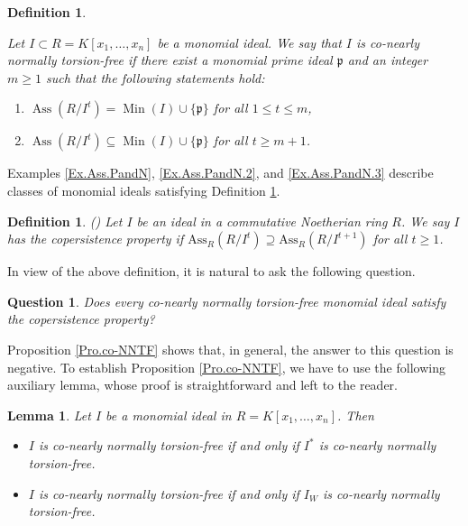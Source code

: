 \documentclass[11pt]{amsart}
\newtheorem{question}[theorem]{Question}
\newtheorem{lemma}[theorem]{Lemma}
\newtheorem{definition}[theorem]{Definition}
\begin{document}
   \begin{definition}\label{Def.co-NNTF}
\em{
Let $I \subset R = K[x_1,\dots,x_n]$ be a  monomial ideal. We say that  $I$ is \textit{co-nearly normally torsion-free}
 if there exist  a monomial prime ideal $\mathfrak{p}$ 
and an integer $m \geq 1$ such that  the following statements hold:
\begin{enumerate}
\item[(i)]  $\operatorname{Ass}(R/I^t) = \operatorname{Min}(I) \cup \{\mathfrak{p}\}$ for all $1 \leq t \leq m$,
\item[(ii)]   $\operatorname{Ass}(R/I^t) \subseteq \operatorname{Min}(I) \cup \{\mathfrak{p}\}$ for all $t \geq m+1$.
\end{enumerate}
}
\end{definition}

Examples  \ref{Ex.Ass.PandN},  \ref{Ex.Ass.PandN.2}, and \ref{Ex.Ass.PandN.3} describe classes of monomial ideals satisfying 
Definition \ref{Def.co-NNTF}.


 \begin{definition} (\cite{NT.3})
    \em{Let $I$ be an ideal in  a commutative Noetherian ring  $R$.
      We say   $I$  has the \textit{copersistence property} if 
$\mathrm{Ass}_R(R/I^t) \supseteq  \mathrm{Ass}_R(R/I^{t+1})$ for all $t\geq 1$.   
   }
  \end{definition}
  
  In view of the above definition, it is natural to ask the following question.
  
  \begin{question}
  Does every co-nearly normally torsion-free monomial ideal satisfy the copersistence property?
    \end{question}
  
  
  Proposition \ref{Pro.co-NNTF} shows that, in general, the answer to this question is negative. To establish Proposition  \ref{Pro.co-NNTF}, 
  we have to  use the following auxiliary lemma, whose proof is straightforward and left to the reader.
  
   \begin{lemma}\label{Pro.co-NNTF.Expansion.Weighted}
Let $I$ be a monomial ideal in $R=K[x_1,\ldots,x_n]$.   Then
\begin{itemize}
\item[(1)]   $I$ is co-nearly normally torsion-free if and only if  $I^*$ is co-nearly normally torsion-free.
\item[(2)]  $I$ is co-nearly normally torsion-free if and only if   $I_W$ is  co-nearly normally torsion-free.
\end{itemize}
\end{lemma}
  
\end{document}
